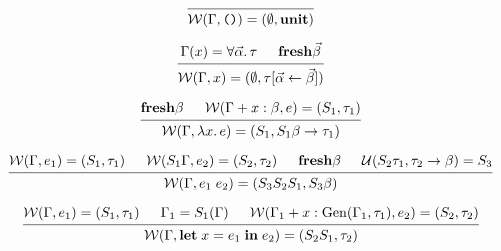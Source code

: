 \documentclass[12pt]{article}
\begin{document}
\pagestyle{empty}

\[
    \begin{prooftree}
        \infer0{\mathcal{W}(\Gamma, \text{\texttt{()}}) = (\emptyset, \mathbf{unit})}
    \end{prooftree}
\]

\[
    \begin{prooftree}
        \hypo{\Gamma(x) = \forall \vec{\alpha}\ldotp \tau}
        \hypo{\mathbf{fresh} \vec{\beta}}
        \infer2{\mathcal{W}(\Gamma, x) = (\emptyset, \tau[\vec{\alpha}\leftarrow\vec{\beta}])}
    \end{prooftree}
\]

\[
    \begin{prooftree}
        \hypo{\mathbf{fresh} \beta}
        \hypo{\mathcal{W}(\Gamma + x:\beta, e) = (S_1, \tau_1)}
        \infer2{\mathcal{W}(\Gamma, \lambda x\ldotp e) = (S_1, S_1\beta \to \tau_1)}
    \end{prooftree}
\]

\[
    \begin{prooftree}
        \hypo{\mathcal{W}(\Gamma, e_1) = (S_1, \tau_1)}
        \hypo{\mathcal{W}(S_1\Gamma, e_2) = (S_2, \tau_2)}
        \hypo{\mathbf{fresh} \beta}
        \hypo{\mathcal{U}(S_2\tau_1, \tau_2 \to \beta) = S_3}
        \infer4{\mathcal{W}(\Gamma, e_1\; e_2) = (S_3S_2S_1, S_3\beta)}
    \end{prooftree}
\]

\[
    \begin{prooftree}
        \hypo{\mathcal{W}(\Gamma, e_1) = (S_1, \tau_1)}
        \hypo{\Gamma_1 = S_1(\Gamma)}
        \hypo{\mathcal{W}(\Gamma_1 + x:\mathrm{Gen}(\Gamma_1, \tau_1), e_2) = (S_2, \tau_2)}
        \infer3{\mathcal{W}(\Gamma, \mathbf{let}\;x = e_1\;\mathbf{in}\; e_2) = (S_2S_1, \tau_2)}
    \end{prooftree}
\]
\end{document}
